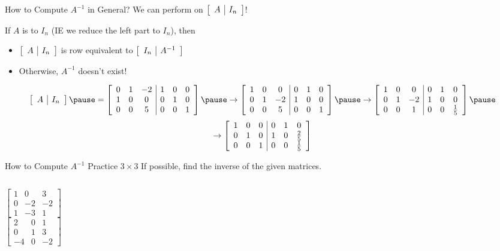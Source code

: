 \documentclass[xcoler=dvipsnames, aspectratio=169]{beamer}
\begin{document}
    \begin{frame}{How to Compute $A^{-1}$ in General?}
        \small
        We can perform  on $\aMat{c|c}{A&I_n}$!\pause
        
        If $A$ is  to $I_n$ (IE we reduce the left part to $I_n$), then\pause
        \begin{itemize}
            \item $\aMat{c|c}{A&I_n}$ is row equivalent to $\aMat{c|c}{I_n&A^{-1}}$\pause
            \item Otherwise, $A^{-1}$ doesn't exist!\pause
        \end{itemize}
        \begin{example}
            \[
                \aMat{c|c}{A&I_n}\pause = \aMat{ccc|ccc}{
                    0 & 1 & -2 & 1 & 0 & 0 \\
                    1 & 0 & 0 &  0 & 1 & 0 \\
                    0 & 0 & 5 &  0 & 0 & 1
                }\pause\rightarrow\aMat{ccc|ccc}{
                    1 & 0 & 0 &  0 & 1 & 0 \\
                    0 & 1 & -2 & 1 & 0 & 0 \\
                    0 & 0 & 5 &  0 & 0 & 1
                }\pause\rightarrow\aMat{ccc|ccc}{
                    1 & 0 & 0 &  0 & 1 & 0 \\
                    0 & 1 & -2 & 1 & 0 & 0 \\
                    0 & 0 & 1 &  0 & 0 & \frac{1}{5}
                }\pause
            \]
            \[\rightarrow\aMat{ccc|ccc}{
                    1 & 0 & 0 &  0 & 1 & 0 \\
                    0 & 1 & 0 &  1 & 0 & \frac{2}{5} \\
                    0 & 0 & 1 &  0 & 0 & \frac{1}{5}
                }
            \]
        \end{example}
    \end{frame}
    \begin{frame}{How to Compute $A^{-1}$ Practice $3\times 3$}
        If possible, find the inverse of the given matrices.
        \begin{columns}
            \[
                \begin{bmatrix}
                    1 & 0 & 3\\
                    0 & -2&-2\\
                    1 & -3& 1
                \end{bmatrix}
            \]
            \[
                \begin{bmatrix}
                    2 & 0 & 1\\
                    0 & 1 & 3\\
                   -4 & 0 &-2
                \end{bmatrix}
            \]
        \end{columns}
        \vspace{130pt}
    \end{frame}
\end{document}

